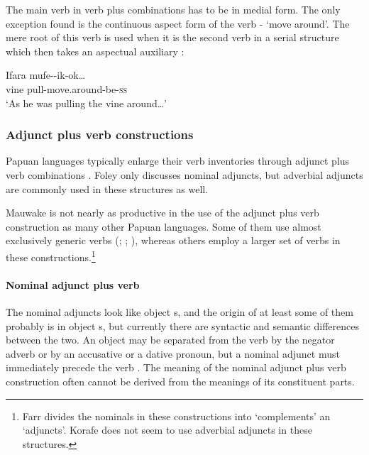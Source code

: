The main verb in verb plus  combinations has to be in medial form. The only exception found is the continuous aspect form of the verb - `move around'. The mere root of this verb is used when it is the second verb in a serial structure which then takes an aspectual auxiliary :

\ea%
\label{ex:3:x391}
\gll Ifara mufe--ik-ok{\dots} \\
vine pull-move.around-be-\textsc{ss} \\
\glt`As he was pulling the vine around{\dots}'
\z

\subsubsection{Adjunct plus verb constructions} \label{sec:3.8.5.2}
{}
Papuan languages typically enlarge their verb inventories through adjunct plus verb combinations \citep[127]{Foley1986}. Foley only discusses nominal adjuncts, but adverbial adjuncts are commonly used in these structures as well. 

Mauwake is not nearly as productive in the use of the adjunct plus verb construction as many other Papuan languages. Some of them use almost exclusively generic verbs (\citealt[117]{Foley1986}; \citealt[309]{Roberts1987}; \citealt[145]{Whitehead2004}), whereas others employ a larger set of verbs \citep[62--66]{Farr1999} in these constructions.\footnote{Farr divides the nominals in these constructions into `complements' an `adjuncts'. Korafe does not seem to use adverbial adjuncts in these structures. } 

\paragraph{Nominal adjunct plus verb}\label{sec:3.8.5.2.1}
{}
The nominal adjuncts look like object s, and the origin of at least some of them probably is in object s, but currently there are syntactic and semantic differences between the two. An object  may be separated from the verb by the negator adverb  or by an accusative or a dative pronoun, but a nominal adjunct must immediately precede the verb . The meaning of the nominal adjunct plus verb construction often cannot be derived from the meanings of its constituent parts. 

